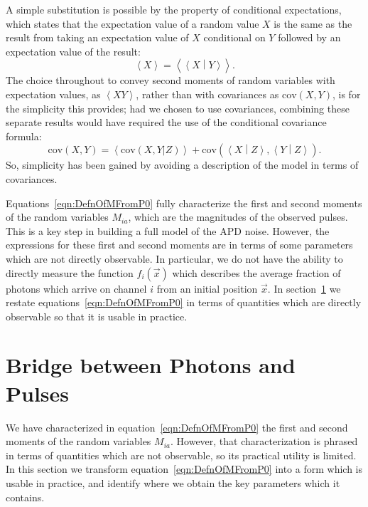 A simple substitution is possible by the property of conditional expectations, which states that the expectation value of a random value $X$ is the same as the result from taking an expectation value of $X$ conditional on $Y$ followed by an expectation value of the result:~\cite{ProbabilityTextbook}
\begin{equation}
\left<X \right> = \left< \left< X \middle\vert Y\right>\right>.
\end{equation}
The choice throughout to convey second moments of random variables with expectation values, as $\left<XY\right>$, rather than with covariances as $\mathrm{cov}(X,Y)$, is for the simplicity this provides; had we chosen to use covariances, combining these separate results would have required the use of the conditional covariance formula:~\cite{ProbabilityTextbook}
\begin{equation}
\mathrm{cov}(X,Y) = \left<\mathrm{cov}(X,Y \vert Z)\right> + \mathrm{cov}\left(\left<X\middle\vert Z\right>, \left<Y\middle\vert Z\right>\right).
\end{equation}
So, simplicity has been gained by avoiding a description of the model in terms of covariances.

Equations~\ref{eqn:DefnOfMFromP0} fully characterize the first and second moments of the random variables $M_{ia}$, which are the magnitudes of the observed pulses.  This is a key step in building a full model of the APD noise.  However, the expressions for these first and second moments are in terms of some parameters which are not directly observable.  In particular, we do not have the ability to directly measure the function $f_i(\vec{x})$ which describes the average fraction of photons which arrive on channel $i$ from an initial position $\vec{x}$.  In section~\ref{sec:BridgePhotonsPulses} we restate equations~\ref{eqn:DefnOfMFromP0} in terms of quantities which are directly observable so that it is usable in practice.

\section{Bridge between Photons and Pulses}\label{sec:BridgePhotonsPulses}

We have characterized in equation~\ref{eqn:DefnOfMFromP0} the first and second moments of the random variables $M_{ia}$.  However, that characterization is phrased in terms of quantities which are not observable, so its practical utility is limited.  In this section we transform equation~\ref{eqn:DefnOfMFromP0} into a form which is usable in practice, and identify where we obtain the key parameters which it contains.

